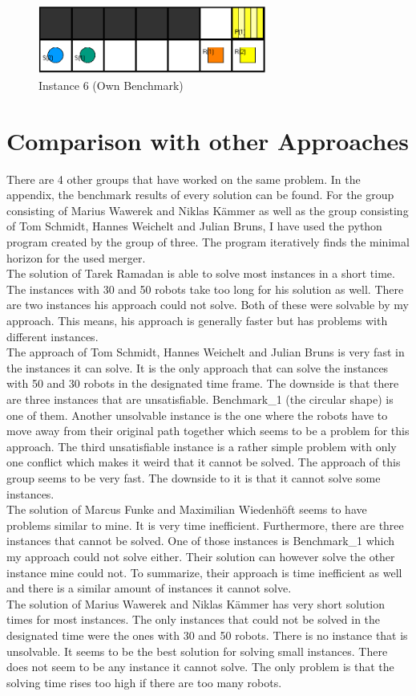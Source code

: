 \documentclass[runningheads]{llncs}
\begin{document}
\begin{figure}[h]
\includegraphics[width=75mm]{Images/Instance 3}
\caption{Instance 6 (Own Benchmark)}
\label{fig:I3}
\end{figure}


\section{Comparison with other Approaches}
There are 4 other groups that have worked on the same problem. In the appendix, the benchmark results of every solution can be found. For the group consisting of Marius Wawerek and Niklas Kämmer as well as the group consisting of Tom Schmidt, Hannes Weichelt and Julian Bruns, I have used the python program created by the group of three. The program iteratively finds the minimal horizon for the used merger. \\
The solution of Tarek Ramadan \cite{github1} is able to solve most instances in a short time. The instances with 30 and 50 robots take too long for his solution as well. There are two instances his approach could not solve. Both of these were solvable by my approach. This means, his approach is generally faster but has problems with different instances. \\
The approach of Tom Schmidt, Hannes Weichelt and Julian Bruns \cite{github2} is very fast in the instances it can solve. It is the only approach that can solve the instances with 50 and 30 robots in the designated time frame. The downside is that there are three instances that are unsatisfiable. Benchmark\_1 (the circular shape) is one of them. Another unsolvable instance is the one where the robots have to move away from their original path together which seems to be a problem for this approach. The third unsatisfiable instance is a rather simple problem with only one conflict which makes it weird that it cannot be solved. The approach of this group seems to be very fast. The downside to it is that it cannot solve some instances.  \\
The solution of Marcus Funke and Maximilian Wiedenhöft \cite{github3} seems to have problems similar to mine. It is very time inefficient. Furthermore, there are three instances that cannot be solved. One of those instances is Benchmark\_1 which my approach could not solve either. Their solution can however solve the other instance mine could not. To summarize, their approach is time inefficient as well and there is a similar amount of instances it cannot solve. \\
The solution of Marius Wawerek and Niklas Kämmer \cite{github4} has very short solution times for most instances. The only instances that could not be solved in the designated time were the ones with 30 and 50 robots. There is no instance that is unsolvable. It seems to be the best solution for solving small instances. There does not seem to be any instance it cannot solve. The only problem is that the solving time rises too high if there are too many robots.
\end{document}
